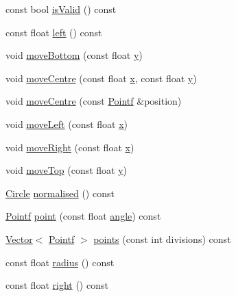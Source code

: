 \begin{DoxyCompactItemize}
\item 
const bool \hyperlink{classprism_1_1_circle_adbc46c944f02c028ec95acd1a9b69c5b}{is\+Valid} () const 
\item 
const float \hyperlink{classprism_1_1_circle_a8bcb92c5bf29227e2ef5ab0f15b479b2}{left} () const 
\item 
void \hyperlink{classprism_1_1_circle_a6392112dd312ec8564596fe00b1e48fa}{move\+Bottom} (const float \hyperlink{classprism_1_1_circle_a6edc045d912b0d278bd0673af028290e}{y})
\item 
void \hyperlink{classprism_1_1_circle_a1ba209c5aed82199e76427311e4781d2}{move\+Centre} (const float \hyperlink{classprism_1_1_circle_ae1f729f8fa34605123628e67b230b6be}{x}, const float \hyperlink{classprism_1_1_circle_a6edc045d912b0d278bd0673af028290e}{y})
\item 
void \hyperlink{classprism_1_1_circle_aad52d595e31c43a9dc8a3b6ea210a285}{move\+Centre} (const \hyperlink{classprism_1_1_pointf}{Pointf} \&position)
\item 
void \hyperlink{classprism_1_1_circle_a68a4710fab3752158a149bd9be64f393}{move\+Left} (const float \hyperlink{classprism_1_1_circle_ae1f729f8fa34605123628e67b230b6be}{x})
\item 
void \hyperlink{classprism_1_1_circle_ae7d7bbe94f43d61ae8adc764e6cf0e9a}{move\+Right} (const float \hyperlink{classprism_1_1_circle_ae1f729f8fa34605123628e67b230b6be}{x})
\item 
void \hyperlink{classprism_1_1_circle_a6ed1dd2554b297751bb29c22eae26038}{move\+Top} (const float \hyperlink{classprism_1_1_circle_a6edc045d912b0d278bd0673af028290e}{y})
\item 
\hyperlink{classprism_1_1_circle}{Circle} \hyperlink{classprism_1_1_circle_a6216b04502cff2b3367d417b1c4b3c5a}{normalised} () const 
\item 
\hyperlink{classprism_1_1_pointf}{Pointf} \hyperlink{classprism_1_1_circle_a42e70e1d37414bf4c22500b80b168c9d}{point} (const float \hyperlink{classprism_1_1_circle_ad4b91cf13b593a67abf9782db3fec5d9}{angle}) const 
\item 
\hyperlink{classprism_1_1_vector}{Vector}$<$ \hyperlink{classprism_1_1_pointf}{Pointf} $>$ \hyperlink{classprism_1_1_circle_ad6916936a346137cdf93227edfb1cbaf}{points} (const int divisions) const 
\item 
const float \hyperlink{classprism_1_1_circle_a75afa2c59f92909d6b6edcec338030fb}{radius} () const 
\item 
const float \hyperlink{classprism_1_1_circle_a3b8cdbb5ad090615534c09543afadf88}{right} () const 

\end{DoxyCompactItemize}
